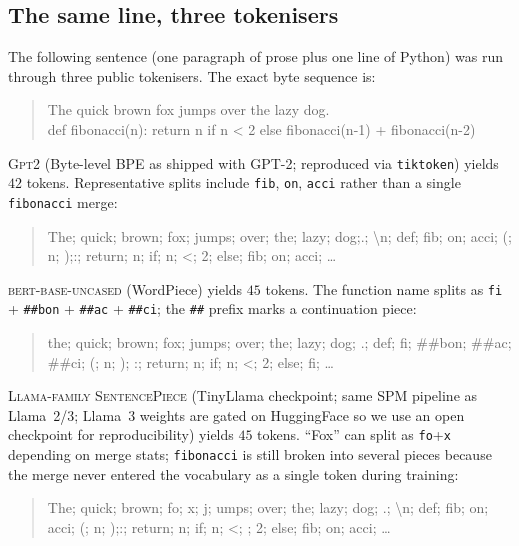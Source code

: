 \subsection{The same line, three tokenisers}

The following sentence (one paragraph of prose plus one line of Python) was
run through three public tokenisers. The exact byte sequence is:

\begin{quote}\small\ttfamily
The quick brown fox jumps over the lazy dog.\\
def fibonacci(n): return n if n < 2 else fibonacci(n-1) + fibonacci(n-2)
\end{quote}

\noindent
\textsc{Gpt2} (Byte-level BPE as shipped with GPT-2; reproduced via
\texttt{tiktoken}) yields \(42\) tokens. Representative splits include
\texttt{fib}, \texttt{on}, \texttt{acci} rather than a single
\texttt{fibonacci} merge:

\begin{quote}\footnotesize\ttfamily\raggedright
The; quick; brown; fox; jumps; over; the; lazy; dog;.; \textbackslash n;
def; fib; on; acci; (; n; );:; return; n; if; n; <; 2; else; fib; on; acci; \ldots
\end{quote}

\noindent
\textsc{bert-base-uncased} (WordPiece) yields \(45\) tokens. The function name
splits as \texttt{fi} + \texttt{\#\#bon} + \texttt{\#\#ac} + \texttt{\#\#ci}; the
\texttt{\#\#} prefix marks a continuation piece:

\begin{quote}\footnotesize\ttfamily\raggedright
the; quick; brown; fox; jumps; over; the; lazy; dog; .; def; fi; \#\#bon; \#\#ac; \#\#ci; (; n; ); :; return; n; if; n; <; 2; else; fi; \ldots
\end{quote}

\noindent
\textsc{Llama-family SentencePiece} (TinyLlama checkpoint; same SPM pipeline as
Llama~2/3; Llama~3 weights are gated on HuggingFace so we use an open
checkpoint for reproducibility) yields \(45\) tokens. ``Fox'' can split as
\texttt{fo}+\texttt{x} depending on merge stats; \texttt{fibonacci} is still
broken into several pieces because the merge never entered the vocabulary as a
single token during training:

\begin{quote}\footnotesize\ttfamily\raggedright
The; quick; brown; fo; x; j; umps; over; the; lazy; dog; .; \textbackslash n;
def; fib; on; acci; (; n; );:; return; n; if; n; <; ; 2; else; fib; on; acci; \ldots
\end{quote}


